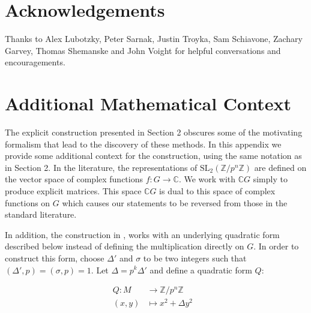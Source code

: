 \documentclass[12pt,reqno]{amsart}
\theoremstyle{remark}
\numberwithin{table}{section}
\newcommand{\C}{\mathbb C}
\newcommand{\Z}{\mathbb Z}
\newcommand{\slpn}{\text{SL}_2(\Z/p^n \Z)}
\begin{document}






\section*{Acknowledgements} Thanks to Alex Lubotzky, Peter Sarnak, Justin Troyka, Sam Schiavone, Zachary Garvey, Thomas Shemanske and John Voight for helpful conversations and encouragements. 





\appendix

\section{Additional Mathematical Context}
The explicit construction presented in Section 2 obscures some of the motivating formalism that lead to the discovery of these methods. In this appendix we provide some additional context for the construction, using the same notation as in Section 2. 
In the literature, the representations of $\slpn$ are defined on the vector space of complex functions $f : G \to \C$. We work with $\C G$ simply to produce explicit matrices. This space $\C G$ is dual to this space of complex functions on $G$ which causes our statements to be reversed from those in the standard literature.

In addition, the construction in \cite{nobs1976irreduziblen}, \cite{nobs1976irreduziblenp1} works with an underlying quadratic form described below instead of defining the multiplication directly on $G$. In order to construct this form, choose $\Delta'$ and $\sigma$ to be two integers such that $(\Delta',p) = (\sigma,p) =1$. Let $\Delta = p^k \Delta' $ and define a quadratic form $Q$:

\[ \begin{aligned} 
Q : M & \to \Z/p^n\Z   &  \\
(x,y) & \mapsto x^2 + \Delta y^2   &   
\end{aligned} \]
\end{document}
